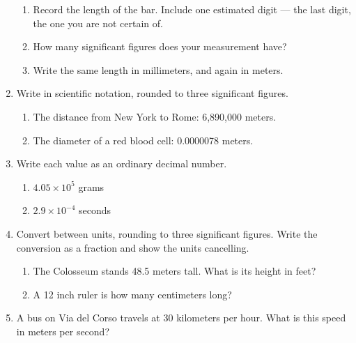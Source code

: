 \documentclass[12pt, twoside]{article}
\begin{document}
\begin{enumerate}[itemsep=0.4cm]
  \begin{enumerate}[itemsep=0.9cm]
    \item Record the length of the bar. Include one estimated digit --- the last digit, the one you are not certain of.
    \item How many significant figures does your measurement have?
    \item Write the same length in millimeters, and again in meters.
  \end{enumerate} \vspace{0.9cm}

\item Write in scientific notation, rounded to three significant figures.
  \begin{multicols}{2}
    \begin{enumerate}[itemsep=1.3cm]
      \item The distance from New York to Rome: 6,890,000 meters.
      \item The diameter of a red blood cell: 0.0000078 meters.
    \end{enumerate}
  \end{multicols} \vspace{2cm}

\newpage

\item Write each value as an ordinary decimal number.
  \begin{multicols}{2}
    \begin{enumerate}[itemsep=1.2cm]
      \item $4.05 \times 10^{5}$ grams
      \item $2.9 \times 10^{-4}$ seconds
    \end{enumerate}
  \end{multicols} \vspace{1.6cm}

\item Convert between units, rounding to three significant figures. Write the conversion as a fraction and show the units cancelling.
  \begin{enumerate}[itemsep=2.2cm]
    \item The Colosseum stands 48.5 meters tall. What is its height in feet?
    \item A 12 inch ruler is how many centimeters long?
  \end{enumerate} \vspace{2cm}

\item A bus on Via del Corso travels at 30 kilometers per hour. What is this speed in meters per second? \vspace{3cm}


\end{enumerate}
\end{document}
